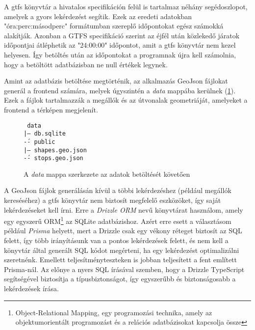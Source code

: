 A gtfs könyvtár a hivatalos specifikáción felül is tartalmaz néhány segédoszlopot, amelyek a gyors lekérdezést segítik. Ezek az eredeti adatokban "óra:perc:másodperc" formátumban szereplő időpontokat egész számokká alakítják. Azonban a GTFS specifikáció szerint az éjfél után közlekedő járatok időpontjai átléphetik az "24:00:00" időpontot, amit a gtfs könyvtár nem kezel helyesen. Így betöltés után az időpontokat a programnak újra kell számolnia, hogy a betöltött adatbázisban ne null értékek legynek.

Amint az adatbázis betöltése megtörténik, az alkalmazás GeoJson fájlokat generál a frontend számára, melyek úgyszintén a \textit{data} mappába kerülnek (\ref{fig:data-folder-structure}). Ezek a fájlok tartalmazzák a megállók és az útvonalak geometriáját\cite{rfc7946}, amelyeket a frontend a térképen megjelenít.

\begin{figure}[H]
    \texttt{
        data\\
        |-- db.sqlite\\
        \'-- public\\
        \hspace{1em} |-- shapes.geo.json\\
        \hspace{1em} \'-- stops.geo.json
    }
    \caption{A \textit{data} mappa szerkezete az adatok betöltését követően}
    \label{fig:data-folder-structure}
\end{figure}

A GeoJson fájlok generálásán kívül a többi lekérdezéshez (például megállók kereséséhez) a gtfs könyvtár nem biztosít megfelelő eszközöket, így saját lekérdezéseket kell írni. Erre a \textit{Drizzle ORM} nevű könyvtárat használom, amely egy egyszerű ORM\footnote{Object-Relational Mapping, egy programozási technika, amely az objektumorientált programozást és a relációs adatbázisokat kapcsolja össze} az SQLite adatbázishoz. Azért erre esett a választásom például \textit{Prisma} helyett, mert a Drizzle csak egy vékony réteget biztosít az SQL felett\cite{drizzledocs}, így több irányításunk van a pontos lekérdezések felett, és nem kell a könyvtár által generált SQL kódot megérteni, ha egy lekérdezést optimalizálni szeretnénk. Emellett teljesítményteszteken is jobban teljesített a fent említett Prisma-nál\cite{drizzlebenchmark}. Az előnye a nyers SQL írásával szemben, hogy a Drizzle TypeScript segítségével biztosítja a típusbiztonságot, így egyszerűbb és biztonságosabb a lekérdezések írása.

